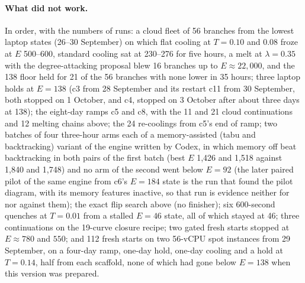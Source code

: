 \documentclass[11pt]{article}
\begin{document}
\paragraph{What did not work.} In order, with the numbers of runs: a cloud fleet of 56 branches from the lowest
laptop states (26--30 September) on which flat cooling at $T=0.10$ and $0.08$ froze at $E$ 500--600, standard cooling
sat at 230--276 for five hours, a melt at $\lambda=0.35$ with the degree-attacking proposal blew 16 branches up to
$E\approx22{,}000$, and the 138 floor held for 21 of the 56 branches with none lower in 35 hours; three laptop holds at
$E=138$ (c3 from 28 September and its restart c11 from 30 September, both stopped on 1 October, and c4, stopped on
3 October after about three days at 138); the eight-day ramps c5 and c8, with the 11 and 21 cloud continuations and
12 melting chains above; the 24 re-coolings from c5's end of ramp; two batches of four three-hour arms each of a
memory-assisted (tabu and backtracking) variant of the engine written by Codex, in which memory off beat backtracking in
both pairs of the first batch (best $E$ 1,426 and 1,518 against 1,840 and 1,748) and no arm of the second went below
$E=92$ (the later paired pilot of the same engine from c6's $E=184$ state is the run that found the pilot diagram,
with its memory features inactive, so that run is evidence neither for nor against them); the exact flip search
above (no finisher); six 600-second quenches at $T=0.01$ from a stalled $E=46$ state,
all of which stayed at 46; three continuations on the 19-curve closure recipe; two gated fresh starts stopped at
$E\approx780$ and $550$; and 112 fresh starts on two 56-vCPU spot instances from 29 September, on a four-day ramp,
one-day hold, one-day cooling and a hold at $T=0.14$, half from each scaffold, none of which had gone below $E=138$
when this version was prepared.
\end{document}
